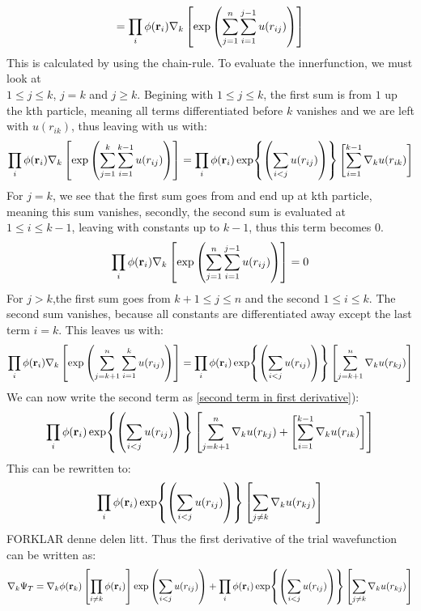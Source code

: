\documentclass[a4paper, 10pt]{article}
\begin{document}
\begin{appendices}
\begin{align}
  = \prod_{i}\phi(\bold{r}_{i})\nabla_{k}\left[\exp\left(\sum_{j = 1}^{n}\sum_{i = 1}^{j-1}u(r_{ij})\right)\right]
  \label{second term in first derivative}
\end{align}
This is calculated by using the chain-rule. To evaluate the innerfunction, we must look
at \\$1 \le j \le k$, $j = k$ and $j \ge k$. Begining with $1\le  j \le k$,
the first sum is from $1$ up the kth particle, meaning all terms differentiated before $k$ vanishes
and we are left with $u(r_{ik})$, thus leaving with us with:
\begin{align}
  \prod_{i}\phi(\bold{r}_{i})\nabla_{k}\left[\exp\left(\sum_{j = 1}^{k}\sum_{i = 1}^{k-1}u(r_{ij})\right)\right]
  =
  \prod_{i}\phi(\bold{r}_{i})\exp{\left(\sum_{i<j}u(r_{ij})\right)}
  \left[\sum_{i = 1}^{k-1}\nabla_{k}u(r_{ik})\right]
\end{align}
For $j = k$, we see that the first sum goes from and end up at kth particle, meaning
this sum vanishes, secondly, the second sum is evaluated at $1 \le i \le k-1$, leaving with
constants up to $k-1$, thus this term becomes $0$.
\begin{align}
\prod_{i}\phi(\bold{r}_{i})\nabla_{k}\left[\exp\left(\sum_{j = 1}^{n}\sum_{i = 1}^{j-1}u(r_{ij})\right)\right]
= 0
\end{align}
For $j > k$,the first sum goes from $k+1\le j \le n$ and the second $1 \le i \le k$.  The second sum vanishes, because all constants are differentiated away
except the last term $i = k$. This leaves us with:
\begin{align}
  \prod_{i}\phi(\bold{r}_{i})\nabla_{k}\left[\exp\left(\sum_{j = k+1}^{n}\sum_{i = 1}^{k}u(r_{ij})\right)\right]
  = \prod_{i}\phi(\bold{r}_{i})
  \exp{\left(\sum_{i<j}u(r_{ij})\right)}
  \left[\sum_{j = k + 1}^{n}\nabla_{k}u(r_{kj})\right]
\end{align}
We can now write the second term as \ref{second term in first derivative}):
\begin{align}\label{combined sum}
\prod_{i}\phi(\bold{r}_{i})
  \exp{\left(\sum_{i<j}u(r_{ij})\right)}
  \left[\sum_{j = k + 1}^{n}\nabla_{k}u(r_{kj}) +
  \left[\sum_{i = 1}^{k-1}\nabla_{k}u(r_{ik})\right]\right]
\end{align}
This can be rewritten to:
  \begin{align}
  \prod_{i}\phi(\bold{r}_{i})
    \exp{\left(\sum_{i<j}u(r_{ij})\right)}
    \left[\sum_{j \neq k}\nabla_{k}u(r_{kj})\right]
  \end{align}
  FORKLAR denne delen litt. Thus the first derivative of the trial wavefunction
  can be written as:
  \begin{align}
    \nabla_{k}\Psi_{T} =
    \nabla_k \phi(\mathbf{r}_k)\left[ \prod_{i\neq k} \phi(\mathbf{r}_i)\right]\exp\left(\sum_{i<j}u(r_{ij})\right)
    + \prod_{i}\phi(\bold{r}_{i})
      \exp{\left(\sum_{i<j}u(r_{ij})\right)}
      \left[\sum_{j \neq k}\nabla_{k}u(r_{kj})\right]
  \end{align}
\end{appendices}
\end{document}
